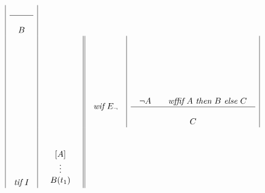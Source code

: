 \[\begin{array}{|c|c||c|c|}
\begin{array}{cc}
\\
\hline\\
\begin{array}{c}
B
\end{array}
\end{array}
\\ %
& &
\begin{array}{l}
\\ \\ \\ \\ \\
\mbox{{\em wif}} \  E_{\neg}
\end{array}
&
\begin{array}{cc}
\\ \\
\begin{array}{c}
\\ \\ \\ \\
\neg A
\end{array}
\ \ \ 
\begin{array}{c}
\\ \\ \\ \\
\mbox{{\em wffif}} \ A \ \mbox{{\em then}} \ B \ \mbox{{\em else}} \ C 
\end{array}
\\
\hline\\
\begin{array}{c}
C
\end{array}
\end{array}
\\ %
\begin{array}{l}
\\ \\ \\ \\ \\
\mbox{{\em tif}} \  I    
\end{array}
&
\begin{array}{cc}
\\ \\
\begin{array}{c}
{[A]}\\
\vdots\\
B(t_1)
\end{array}

\end{array}
\end{array}\]
